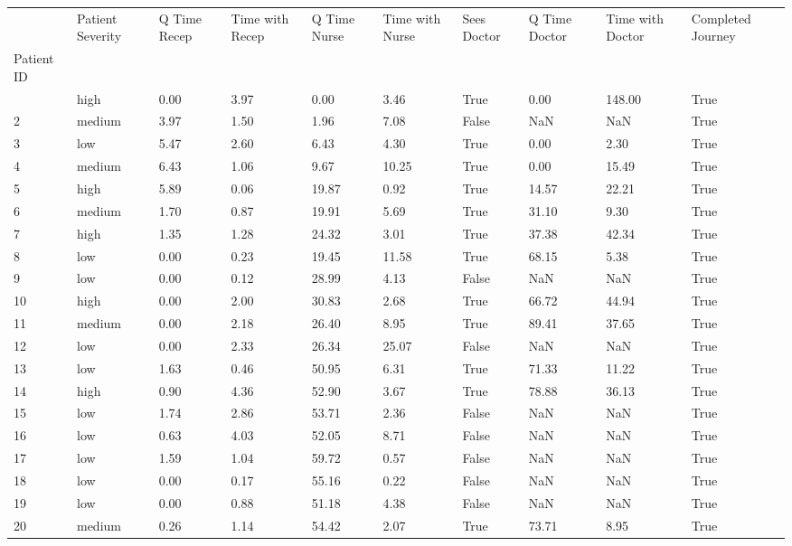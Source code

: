 \documentclass[
  letterpaper,
  DIV=11,
  numbers=noendperiod]{scrreprt}
\begin{document}
\begin{longtable}[]{@{}llllllllll@{}}
\toprule\noalign{}
& Patient Severity & Q Time Recep & Time with Recep & Q Time Nurse &
Time with Nurse & Sees Doctor & Q Time Doctor & Time with Doctor &
Completed Journey \\
Patient ID & & & & & & & & & \\
\midrule\noalign{}
\endhead
\bottomrule\noalign{}
\endlastfoot
1 & high & 0.00 & 3.97 & 0.00 & 3.46 & True & 0.00 & 148.00 & True \\
2 & medium & 3.97 & 1.50 & 1.96 & 7.08 & False & NaN & NaN & True \\
3 & low & 5.47 & 2.60 & 6.43 & 4.30 & True & 0.00 & 2.30 & True \\
4 & medium & 6.43 & 1.06 & 9.67 & 10.25 & True & 0.00 & 15.49 & True \\
5 & high & 5.89 & 0.06 & 19.87 & 0.92 & True & 14.57 & 22.21 & True \\
6 & medium & 1.70 & 0.87 & 19.91 & 5.69 & True & 31.10 & 9.30 & True \\
7 & high & 1.35 & 1.28 & 24.32 & 3.01 & True & 37.38 & 42.34 & True \\
8 & low & 0.00 & 0.23 & 19.45 & 11.58 & True & 68.15 & 5.38 & True \\
9 & low & 0.00 & 0.12 & 28.99 & 4.13 & False & NaN & NaN & True \\
10 & high & 0.00 & 2.00 & 30.83 & 2.68 & True & 66.72 & 44.94 & True \\
11 & medium & 0.00 & 2.18 & 26.40 & 8.95 & True & 89.41 & 37.65 &
True \\
12 & low & 0.00 & 2.33 & 26.34 & 25.07 & False & NaN & NaN & True \\
13 & low & 1.63 & 0.46 & 50.95 & 6.31 & True & 71.33 & 11.22 & True \\
14 & high & 0.90 & 4.36 & 52.90 & 3.67 & True & 78.88 & 36.13 & True \\
15 & low & 1.74 & 2.86 & 53.71 & 2.36 & False & NaN & NaN & True \\
16 & low & 0.63 & 4.03 & 52.05 & 8.71 & False & NaN & NaN & True \\
17 & low & 1.59 & 1.04 & 59.72 & 0.57 & False & NaN & NaN & True \\
18 & low & 0.00 & 0.17 & 55.16 & 0.22 & False & NaN & NaN & True \\
19 & low & 0.00 & 0.88 & 51.18 & 4.38 & False & NaN & NaN & True \\
20 & medium & 0.26 & 1.14 & 54.42 & 2.07 & True & 73.71 & 8.95 & True \\
\end{longtable}
\end{document}

